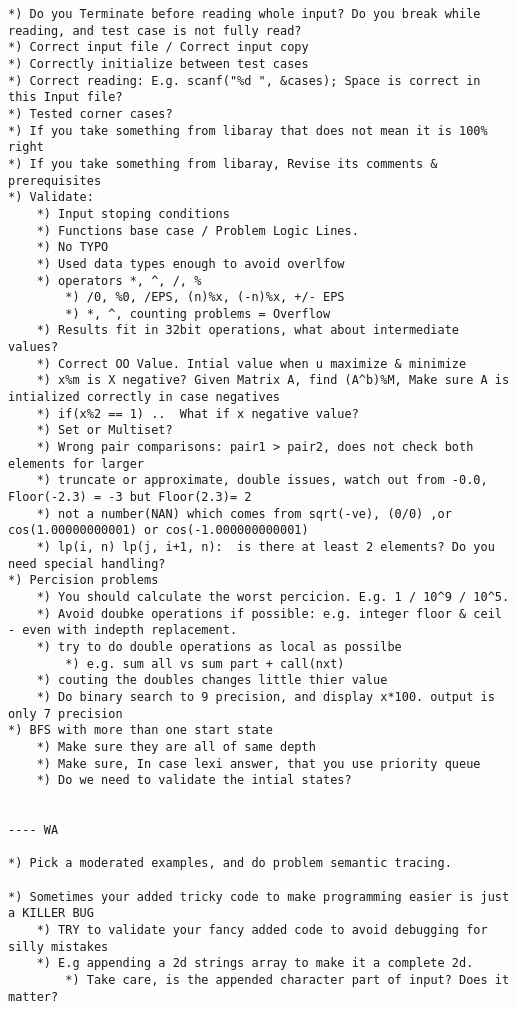 \documentclass[12pt,a4paper,onesided]{article}
\begin{document}
\begin{multicols}{3}
\begin{lstlisting}
*) Do you Terminate before reading whole input? Do you break while reading, and test case is not fully read?
*) Correct input file / Correct input copy
*) Correctly initialize between test cases
*) Correct reading: E.g. scanf("%d ", &cases); Space is correct in this Input file?
*) Tested corner cases?
*) If you take something from libaray that does not mean it is 100% right
*) If you take something from libaray, Revise its comments & prerequisites
*) Validate:
    *) Input stoping conditions
    *) Functions base case / Problem Logic Lines.
    *) No TYPO
    *) Used data types enough to avoid overlfow
    *) operators *, ^, /, %
        *) /0, %0, /EPS, (n)%x, (-n)%x, +/- EPS
        *) *, ^, counting problems = Overflow
    *) Results fit in 32bit operations, what about intermediate values?
    *) Correct OO Value. Intial value when u maximize & minimize
    *) x%m is X negative? Given Matrix A, find (A^b)%M, Make sure A is intialized correctly in case negatives
    *) if(x%2 == 1) ..	What if x negative value?
    *) Set or Multiset?
    *) Wrong pair comparisons: pair1 > pair2, does not check both elements for larger
    *) truncate or approximate, double issues, watch out from -0.0, Floor(-2.3) = -3 but Floor(2.3)= 2
    *) not a number(NAN) which comes from sqrt(-ve), (0/0) ,or cos(1.00000000001) or cos(-1.000000000001)
    *) lp(i, n) lp(j, i+1, n):  is there at least 2 elements? Do you need special handling?
*) Percision problems
    *) You should calculate the worst percicion. E.g. 1 / 10^9 / 10^5.
    *) Avoid doubke operations if possible: e.g. integer floor & ceil - even with indepth replacement.
    *) try to do double operations as local as possilbe
        *) e.g. sum all vs sum part + call(nxt)
    *) couting the doubles changes little thier value
    *) Do binary search to 9 precision, and display x*100. output is only 7 precision
*) BFS with more than one start state
    *) Make sure they are all of same depth
    *) Make sure, In case lexi answer, that you use priority queue
    *) Do we need to validate the intial states?
	
	
---- WA

*) Pick a moderated examples, and do problem semantic tracing.
	
*) Sometimes your added tricky code to make programming easier is just a KILLER BUG
    *) TRY to validate your fancy added code to avoid debugging for silly mistakes
    *) E.g appending a 2d strings array to make it a complete 2d.
        *) Take care, is the appended character part of input? Does it matter?
			

\end{lstlisting}
\end{multicols}
\end{document}
